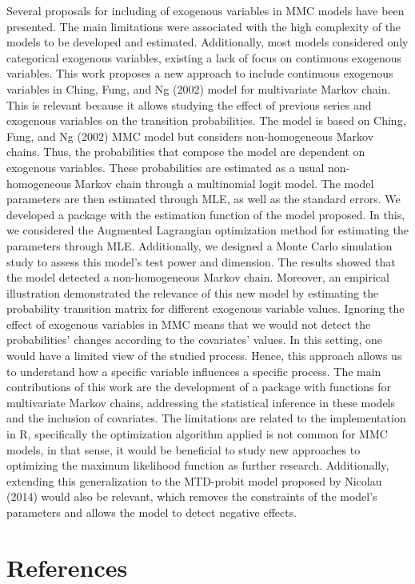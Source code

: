 Several proposals for including of exogenous variables in MMC models have been presented. The main limitations were associated with the high complexity of the models to be developed and estimated. Additionally, most models considered only categorical exogenous variables, existing a lack of focus on continuous exogenous variables. This work proposes a new approach to include continuous exogenous variables in Ching, Fung, and Ng (2002) model for multivariate Markov chain. This is relevant because it allows studying the effect of previous series and exogenous variables on the transition probabilities. The model is based on Ching, Fung, and Ng (2002) MMC model but considers non-homogeneous Markov chains. Thus, the probabilities that compose the model are dependent on exogenous variables. These probabilities are estimated as a usual non-homogeneous Markov chain through a multinomial logit model. The model parameters are then estimated through MLE, as well as the standard errors. We developed a package with the estimation function of the model proposed. In this, we considered the Augmented Lagrangian optimization method for estimating the parameters through MLE. Additionally, we designed a Monte Carlo simulation study to assess this model's test power and dimension. The results showed that the model detected a non-homogeneous Markov chain. Moreover, an empirical illustration demonstrated the relevance of this new model by estimating the probability transition matrix for different exogenous variable values. Ignoring the effect of exogenous variables in MMC means that we would not detect the probabilities' changes according to the covariates' values. In this setting, one would have a limited view of the studied process. Hence, this approach allows us to understand how a specific variable influences a specific process. The main contributions of this work are the development of a package with functions for multivariate Markov chains, addressing the statistical inference in these models and the inclusion of covariates. The limitations are related to the implementation in R, specifically the optimization algorithm applied is not common for MMC models, in that sense, it would be beneficial to study new approaches to optimizing the maximum likelihood function as further research. Additionally, extending this generalization to the MTD-probit model proposed by Nicolau (2014) would also be relevant, which removes the constraints of the model's parameters and allows the model to detect negative effects.

\hypertarget{references}{%
\section*{References}\label{references}}

